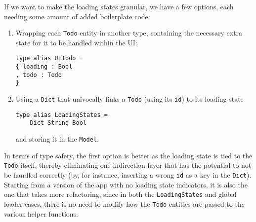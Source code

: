 If we want to make the loading states granular, we have a few options, each needing some amount of added boilerplate code:
\begin{enumerate}
    \item Wrapping each \texttt{Todo} entity in another type, containing the necessary extra state for it to be handled within the UI:
    \begin{verbatim}
type alias UITodo =
{ loading : Bool
, todo : Todo
}
    \end{verbatim}
    \item Using a \texttt{Dict} that univocally links a \texttt{Todo} (using its \texttt{id}) to its loading state
    \begin{verbatim}
type alias LoadingStates =
    Dict String Bool
    \end{verbatim}
    and storing it in the \texttt{Model}.
\end{enumerate} 
In terms of type safety, the first option is better as the loading state is tied to the \texttt{Todo} itself, thereby eliminating one indirection layer that has the potential to not be handled correctly (by, for instance, inserting a wrong \texttt{id} as a key in the \texttt{Dict}).\\
Starting from a version of the app with no loading state indicators, it is also the one that takes more refactoring, since in both the \texttt{LoadingStates} and global loader cases, there is no need to modify how the \texttt{Todo} entities are passed to the various helper functions.\\
